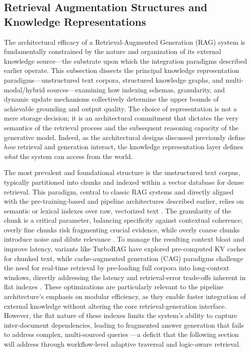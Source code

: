 \documentclass[11pt,a4paper]{article}
\begin{document}
\subsection{Retrieval Augmentation Structures and Knowledge Representations}


The architectural efficacy of a Retrieval-Augmented Generation (RAG) system is fundamentally constrained by the nature and organization of its external knowledge source---the substrate upon which the integration paradigms described earlier operate. This subsection dissects the principal knowledge representation paradigms---unstructured text corpora, structured knowledge graphs, and multi-modal/hybrid sources---examining how indexing schemas, granularity, and dynamic update mechanisms collectively determine the upper bounds of achievable grounding and output quality. The choice of representation is not a mere storage decision; it is an architectural commitment that dictates the very semantics of the retrieval process and the subsequent reasoning capacity of the generative model. Indeed, as the architectural designs discussed previously define \emph{how} retrieval and generation interact, the knowledge representation layer defines \emph{what} the system can access from the world.

The most prevalent and foundational structure is the unstructured text corpus, typically partitioned into chunks and indexed within a vector database for dense retrieval. This paradigm, central to classic RAG systems and directly aligned with the pre-training-based and pipeline architectures described earlier, relies on semantic or lexical indexes over raw, vectorized text \cite{arxiv:2005.11401v4}. The granularity of the chunk is a critical parameter, balancing specificity against contextual coherence; overly fine chunks risk fragmenting crucial evidence, while overly coarse chunks introduce noise and dilute relevance \cite{arxiv:2501.07391v1}. To manage the resulting context bloat and improve latency, variants like TurboRAG have explored pre-computed KV caches for chunked text, while cache-augmented generation (CAG) paradigms challenge the need for real-time retrieval by pre-loading full corpora into long-context windows, directly addressing the latency and retrieval-error trade-offs inherent in flat indexes \cite{arxiv:2410.07590v1,arxiv:2412.15605v2}. These optimizations are particularly relevant to the pipeline architecture's emphasis on modular efficiency, as they enable faster integration of external knowledge without altering the core retrieval-generation interface. However, the flat nature of these indexes limits the system's ability to capture inter-document dependencies, leading to fragmented answer generation that fails to address complex, multi-sourced queries \cite{arxiv:2501.13958v3}---a deficit that the following section will address through workflow-level adaptive traversal and logic-aware retrieval.
\end{document}
